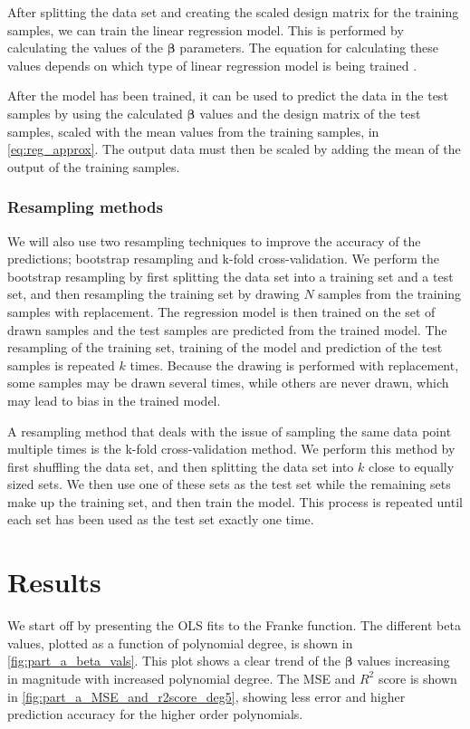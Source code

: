 \documentclass[12pt]{article}
\begin{document}
After splitting the data set and creating the scaled design matrix for the training samples, we can train the linear regression model. This is performed by calculating the values of the $\boldsymbol{\beta}$ parameters. The equation for calculating these values depends on which type of linear regression model is being trained \cite{lecture-notes}.

After the model has been trained, it can be used to predict the data in the test samples by using the calculated $\boldsymbol{\beta}$ values and the design matrix of the test samples, scaled with the mean values from the training samples, in \autoref{eq:reg_approx}. The output data must then be scaled by adding the mean of the output of the training samples.

\subsubsection{Resampling methods}
We will also use two resampling techniques to improve the accuracy of the predictions; bootstrap resampling and k-fold cross-validation. We perform the bootstrap resampling by first splitting the data set into a training set and a test set, and then resampling the training set by drawing $N$ samples from the training samples with replacement. The regression model is then trained on the set of drawn samples and the test samples are predicted from the trained model. The resampling of the training set, training of the model and prediction of the test samples is repeated $k$ times. Because the drawing is performed with replacement, some samples may be drawn several times, while others are never drawn, which may lead to bias in the trained model.

A resampling method that deals with the issue of sampling the same data point multiple times is the k-fold cross-validation method. We perform this method by first shuffling the data set, and then splitting the data set into $k$ close to equally sized sets. We then use one of these sets as the test set while the remaining sets make up the training set, and then train the model. This process is repeated until each set has been used as the test set exactly one time.



\section{Results} \label{sec:results}
We start off by presenting the OLS fits to the Franke function. The different beta values, plotted as a function of polynomial degree, is shown in \autoref{fig:part_a_beta_vals}. This plot shows a clear trend of the $\boldsymbol{\beta}$ values increasing in magnitude with increased polynomial degree. The MSE and $R^2$ score is shown in \autoref{fig:part_a_MSE_and_r2score_deg5}, showing less error and higher prediction accuracy for the higher order polynomials. 
\end{document}
